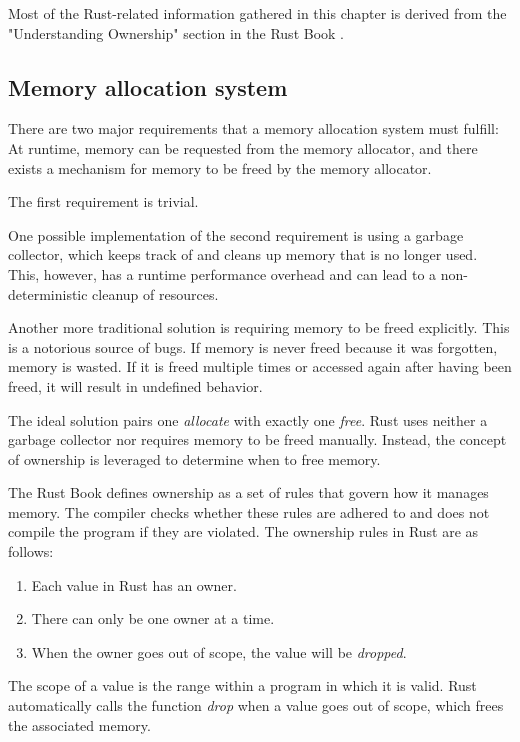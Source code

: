 \documentclass[sigplan,11pt,nonacm]{acmart}
\begin{document}

Most of the Rust-related information gathered in this chapter is derived from the "Understanding Ownership" section in the Rust Book \cite{rust-book}.


\subsection{Memory allocation system}
\label{sec:memory-allocation}

There are two major requirements that a memory allocation system must fulfill:
At runtime, memory can be requested from the memory allocator, and there exists a mechanism for memory to be freed by the memory allocator.

The first requirement is trivial.

One possible implementation of the second requirement is using a garbage collector, which keeps track of and cleans up memory that is no longer used.
This, however, has a runtime performance overhead and can lead to a non-deterministic cleanup of resources.

Another more traditional solution is requiring memory to be freed explicitly.
This is a notorious source of bugs.
If memory is never freed because it was forgotten, memory is wasted.
If it is freed multiple times or accessed again after having been freed, it will result in undefined behavior.

The ideal solution pairs one \emph{allocate} with exactly one \emph{free}.
Rust uses neither a garbage collector nor requires memory to be freed manually.
Instead, the concept of ownership is leveraged to determine when to free memory.

The Rust Book \cite{rust-book} defines ownership as a set of rules that govern how it manages memory.
The compiler checks whether these rules are adhered to and does not compile the program if they are violated.
The ownership rules in Rust are as follows:
\begin{enumerate}
  \item Each value in Rust has an owner.
  \item There can only be one owner at a time.
  \item When the owner goes out of scope, the value will be \emph{dropped}.
\end{enumerate}
The scope of a value is the range within a program in which it is valid.
Rust automatically calls the function \emph{drop} when a value goes out of scope, which frees the associated memory.
\end{document}
